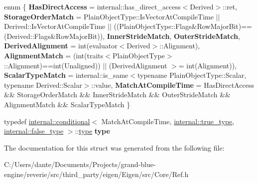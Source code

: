 \begin{DoxyCompactItemize}
\item 
\mbox{\label{struct_eigen_1_1internal_1_1traits_3_01_ref_3_01___plain_object_type_00_01___options_00_01___stride_type_01_4_01_4_1_1match_adca1d0b7f6033c6280371adc2a06df1c}} 
enum \{ \newline
{\bfseries Has\+Direct\+Access} = internal\+::has\+\_\+direct\+\_\+access$<$Derived$>$\+::ret, 
{\bfseries Storage\+Order\+Match} = Plain\+Object\+Type\+::Is\+Vector\+At\+Compile\+Time $\vert$$\vert$ Derived\+::Is\+Vector\+At\+Compile\+Time $\vert$$\vert$ ((Plain\+Object\+Type\+::Flags\&Row\+Major\+Bit)==(Derived\+::Flags\&Row\+Major\+Bit)), 
{\bfseries Inner\+Stride\+Match}, 
{\bfseries Outer\+Stride\+Match}, 
\newline
{\bfseries Derived\+Alignment} = int(evaluator$<$Derived$>$\+::Alignment), 
{\bfseries Alignment\+Match} = (int(traits$<$Plain\+Object\+Type$>$\+::Alignment)==int(Unaligned)) $\vert$$\vert$ (Derived\+Alignment $>$= int(Alignment)), 
{\bfseries Scalar\+Type\+Match} = internal\+::is\+\_\+same$<$typename Plain\+Object\+Type\+::Scalar, typename Derived\+::Scalar$>$\+::value, 
{\bfseries Match\+At\+Compile\+Time} = Has\+Direct\+Access \&\& Storage\+Order\+Match \&\& Inner\+Stride\+Match \&\& Outer\+Stride\+Match \&\& Alignment\+Match \&\& Scalar\+Type\+Match
 \}
\item 
\mbox{\label{struct_eigen_1_1internal_1_1traits_3_01_ref_3_01___plain_object_type_00_01___options_00_01___stride_type_01_4_01_4_1_1match_a80261b560ce9ffdd3a0a150a10bfbd57}} 
typedef \mbox{\hyperlink{struct_eigen_1_1internal_1_1conditional}{internal\+::conditional}}$<$ Match\+At\+Compile\+Time, \mbox{\hyperlink{struct_eigen_1_1internal_1_1true__type}{internal\+::true\+\_\+type}}, \mbox{\hyperlink{struct_eigen_1_1internal_1_1false__type}{internal\+::false\+\_\+type}} $>$\+::\mbox{\hyperlink{struct_eigen_1_1internal_1_1true__type}{type}} {\bfseries type}
\end{DoxyCompactItemize}


The documentation for this struct was generated from the following file\+:\begin{DoxyCompactItemize}
\item 
C\+:/\+Users/dante/\+Documents/\+Projects/grand-\/blue-\/engine/reverie/src/third\+\_\+party/eigen/\+Eigen/src/\+Core/Ref.\+h\end{DoxyCompactItemize}
